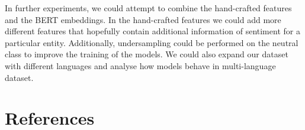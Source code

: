 \documentclass[11pt,a4paper]{article}
\begin{document}
In further experiments, we could attempt to combine the hand-crafted features and the BERT embeddings. 
In the hand-crafted features we could add more different features that hopefully contain additional information of sentiment for a particular entity. 
Additionally, undersampling could be performed on the neutral class to improve the training of the models.
We could also expand our dataset with different languages and analyse how models behave in multi-language dataset.




\section{References}



\end{document}
